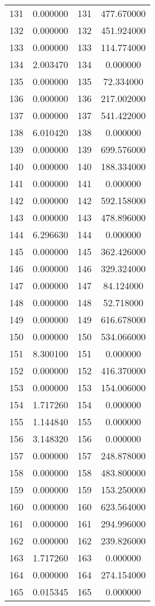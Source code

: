\documentclass[12pt]{article}
\begin{document}
\begin{longtable}{@{}cccc@{}}
131 & 0.000000 & 131 & 477.670000 \\
132 & 0.000000 & 132 & 451.924000 \\
133 & 0.000000 & 133 & 114.774000 \\
134 & 2.003470 & 134 & 0.000000 \\
135 & 0.000000 & 135 & 72.334000 \\
136 & 0.000000 & 136 & 217.002000 \\
137 & 0.000000 & 137 & 541.422000 \\
138 & 6.010420 & 138 & 0.000000 \\
139 & 0.000000 & 139 & 699.576000 \\
140 & 0.000000 & 140 & 188.334000 \\
141 & 0.000000 & 141 & 0.000000 \\
142 & 0.000000 & 142 & 592.158000 \\
143 & 0.000000 & 143 & 478.896000 \\
144 & 6.296630 & 144 & 0.000000 \\
145 & 0.000000 & 145 & 362.426000 \\
146 & 0.000000 & 146 & 329.324000 \\
147 & 0.000000 & 147 & 84.124000 \\
148 & 0.000000 & 148 & 52.718000 \\
149 & 0.000000 & 149 & 616.678000 \\
150 & 0.000000 & 150 & 534.066000 \\
151 & 8.300100 & 151 & 0.000000 \\
152 & 0.000000 & 152 & 416.370000 \\
153 & 0.000000 & 153 & 154.006000 \\
154 & 1.717260 & 154 & 0.000000 \\
155 & 1.144840 & 155 & 0.000000 \\
156 & 3.148320 & 156 & 0.000000 \\
157 & 0.000000 & 157 & 248.878000 \\
158 & 0.000000 & 158 & 483.800000 \\
159 & 0.000000 & 159 & 153.250000 \\
160 & 0.000000 & 160 & 623.564000 \\
161 & 0.000000 & 161 & 294.996000 \\
162 & 0.000000 & 162 & 239.826000 \\
163 & 1.717260 & 163 & 0.000000 \\
164 & 0.000000 & 164 & 274.154000 \\
165 & 0.015345 & 165 & 0.000000 \\

\end{longtable}
\end{document}
